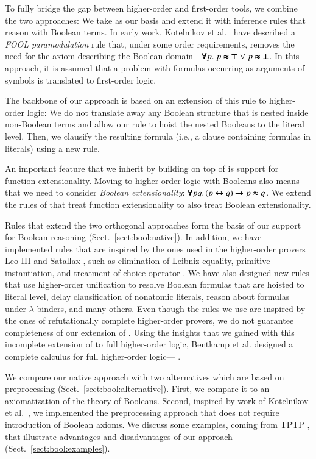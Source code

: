  To fully bridge the gap between higher-order and first-order tools,
we combine the two approaches: We take \lsup{} as our basis and  extend it with inference rules that reason with
Boolean terms. In early work, Kotelnikov et al.\ 
\cite{kotelnikov-15-fool} have described a \emph{FOOL paramodulation}
rule that, under some order requirements, removes the need for the axiom
describing the Boolean domain---$\pmb{\forall} p. \; p \pmb{\approx} \pmb{\top} \mathrel\lor p
\pmb{\approx} \pmb{\bot}$. In this approach, it is assumed that a problem with formulas occurring as
arguments of symbols is translated to first-order logic. 

The backbone of our approach is based on an extension of this rule to higher-order
logic: We do not translate away any Boolean structure that is nested inside
non-Boolean terms and allow our rule to hoist the nested Booleans to the
literal level. Then, we clausify the resulting formula (i.e., a clause containing formulas in literals) using a new rule.


 An important feature that we inherit by building on top of \lsup{}
is support for function extensionality. Moving to higher-order logic with
Booleans also means that we need to consider \emph{Boolean extensionality}:
$\pmb{\forall} pq. \, (p \pmb{\leftrightarrow} q) \pmb{\rightarrow} p \pmb{\approx} q$. We extend the rules of
\lsup{} that treat function extensionality to also treat Boolean
extensionality.

Rules that extend the two orthogonal approaches form the basis of our support
for Boolean reasoning (Sect.~\ref{sect:bool:native}). In addition, we have
implemented rules that are inspired by the ones used in the higher-order provers
Leo-III \cite{sb-21-leo3} and Satallax \cite{cb-12-satallax}, such as
elimination of Leibniz equality, primitive instantiation, and treatment of choice
operator \cite{pa-01-classical-ty-thy}. We have also designed new rules that use
higher-order unification to resolve Boolean formulas that are hoisted to literal
level, delay clausification of nonatomic literals, reason about formulas under
$\lambda$-binders, and many others. Even though the rules we use are inspired by
the ones of refutationally complete higher-order provers, we do not guarantee
completeness of our extension of \lsup{}. Using the insights that we gained with
this incomplete extension of \lsup{} to full higher-order logic, Bentkamp et al.
designed a complete calculus for full higher-order logic---\osup{}
\cite{bbtv-21-full-ho-sup}.


We compare our native approach with two alternatives which are based on
preprocessing (Sect.~\ref{sect:bool:alternative}). First, we compare it to  an
axiomatization of the theory of Booleans. Second, inspired by work of
Kotelnikov et al.\ \cite{kotelnikov-16-fool}, we implemented the preprocessing approach that does not
require introduction of Boolean axioms.
We discuss some examples, coming from TPTP \cite{gs-17-tptp}, that
illustrate advantages and disadvantages of our approach (Sect.~\ref{sect:bool:examples}).

